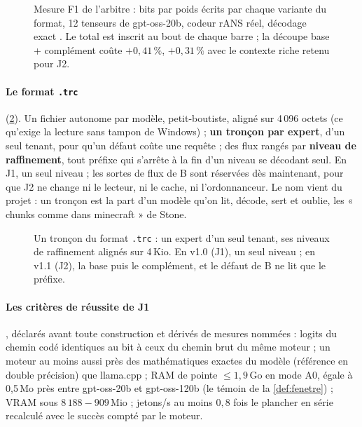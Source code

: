 \begin{figure}[ht]
\centering
\GrapheFun
\caption[Mesure F1 : bits par poids de chaque variante du format]{Mesure F1 de l'arbitre : bits par poids écrits par chaque variante du format, 12 tenseurs de gpt-oss-20b, codeur rANS réel, décodage exact \mes. Le total est inscrit au bout de chaque barre ; la découpe base + complément coûte $+0{,}41\,\%$, $+0{,}31\,\%$ avec le contexte riche retenu pour J2.}
\label{fig:f1}
\end{figure}

\paragraph{Le format \texttt{.trc}} (\cref{fig:troncon}). Un fichier autonome par modèle, petit-boutiste, aligné sur 4\,096 octets (ce qu'exige la lecture sans tampon de Windows) ; \textbf{un tronçon par expert}, d'un seul tenant, pour qu'un défaut coûte une requête ; des flux rangés par \textbf{niveau de raffinement}, tout préfixe qui s'arrête à la fin d'un niveau se décodant seul. En J1, un seul niveau ; les sortes de flux de B sont réservées dès maintenant, pour que J2 ne change ni le lecteur, ni le cache, ni l'ordonnanceur. Le nom vient du projet : un tronçon est la part d'un modèle qu'on lit, décode, sert et oublie, les « chunks comme dans minecraft » de Stone.

\begin{figure}[ht]
\centering
\SchemaTroncon
\caption[Un tronçon du format .trc]{Un tronçon du format \texttt{.trc} : un expert d'un seul tenant, ses niveaux de raffinement alignés sur 4\,Kio. En v1.0 (J1), un seul niveau ; en v1.1 (J2), la base puis le complément, et le défaut de B ne lit que le préfixe.}
\label{fig:troncon}
\end{figure}

\paragraph{Les critères de réussite de J1}, déclarés avant toute construction et dérivés de mesures nommées : logits du chemin codé identiques au bit à ceux du chemin brut du même moteur ; un moteur au moins aussi près des mathématiques exactes du modèle (référence en double précision) que llama.cpp ; RAM de pointe $\le 1{,}9$\,Go en mode A0, égale à 0,5\,Mo près entre gpt-oss-20b et gpt-oss-120b (le témoin de la \cref{def:fenetre}) ; VRAM sous $8\,188 - 909$\,Mio ; jetons/s au moins $0{,}8$ fois le plancher en série recalculé avec le succès compté par le moteur.

